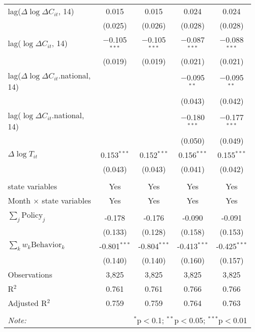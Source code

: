\begin{tabular}{@{\extracolsep{1pt}}lcccc}
  lag($\Delta \log \Delta C_{it}$, 14) & 0.015 & 0.015 & 0.024 & 0.024 \\ 
  & (0.025) & (0.026) & (0.028) & (0.028) \\ 
  lag($\log \Delta C_{it}$, 14) & $-$0.105$^{***}$ & $-$0.105$^{***}$ & $-$0.087$^{***}$ & $-$0.088$^{***}$ \\ 
  & (0.019) & (0.019) & (0.021) & (0.021) \\ 
  lag($\Delta \log \Delta C_{it}$.national, 14) &  &  & $-$0.095$^{**}$ & $-$0.095$^{**}$ \\ 
  &  &  & (0.043) & (0.042) \\ 
  lag($\log \Delta C_{it}$.national, 14) &  &  & $-$0.180$^{***}$ & $-$0.177$^{***}$ \\ 
  &  &  & (0.050) & (0.049) \\ 
  $\Delta \log T_{it}$ & 0.153$^{***}$ & 0.152$^{***}$ & 0.156$^{***}$ & 0.155$^{***}$ \\ 
  & (0.043) & (0.043) & (0.041) & (0.042) \\ 
 \hline \\[-1.8ex] 
state variables & Yes & Yes & Yes & Yes \\ 
Month $\times$ state variables & Yes & Yes & Yes & Yes \\ 
\hline \\[-1.8ex] 
$\sum_j \mathrm{Policy}_j$ & -0.178 & -0.176 & -0.090 & -0.091 \\ 
 & (0.133) & (0.128) & (0.158) & (0.153) \\ 
$\sum_k w_k \mathrm{Behavior}_k$ & -0.801$^{***}$ & -0.804$^{***}$ & -0.413$^{***}$ & -0.425$^{***}$ \\ 
 & (0.140) & (0.140) & (0.160) & (0.157) \\ 
Observations & 3,825 & 3,825 & 3,825 & 3,825 \\ 
R$^{2}$ & 0.761 & 0.761 & 0.766 & 0.766 \\ 
Adjusted R$^{2}$ & 0.759 & 0.759 & 0.764 & 0.763 \\ 
\hline 
\hline \\[-1.8ex] 
\textit{Note:}  & \multicolumn{4}{r}{$^{*}$p$<$0.1; $^{**}$p$<$0.05; $^{***}$p$<$0.01} \\ 
\end{tabular} 